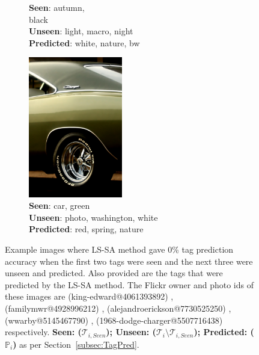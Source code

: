 \begin{figure}
\begin{subfigure}[b]{0.17\textwidth}
                \caption{\textbf{Seen}: autumn, \\ black\\ \textbf{Unseen}: light, macro, night \\ \textbf{Predicted}: white, nature, bw }
                \label{fig:negex4}
        \end{subfigure}%
	\; \vline
        \; %
        \begin{subfigure}[b]{0.18\textwidth}
                \includegraphics[width=0.45\textwidth]{TagTree/Flickrimg/acf2533e-69ac-3e2e-8eab-e024ca9682fd.jpeg}
                \caption{\textbf{Seen}: car, green \\ \textbf{Unseen}: photo, washington, white \\ \textbf{Predicted}: red, spring, nature }
                \label{fig:negex5}
        \end{subfigure}
        \caption{Example images where LS-SA method gave 0\% tag prediction accuracy when the first two tags were seen and the next three were unseen and predicted. Also provided are the tags that were predicted by the LS-SA method. The Flickr owner and photo ids of these images
are (king-edward@4061393892) , (familymwr@4928996212) , (alejandroerickson@7730525250) , (wwarby@5145467790) ,  (1968-dodge-charger@5507716438)  respectively. \textbf{Seen: ($\mathcal{T}_{i,Seen}$); Unseen: ($\mathcal{T}_i \setminus  \mathcal{T}_{i,Seen}$); Predicted: ($\mathbb{P}_i$)} as per Section~\ref{subsec:TagPred}. }  \label{fig:negativeExs}
\end{figure}
